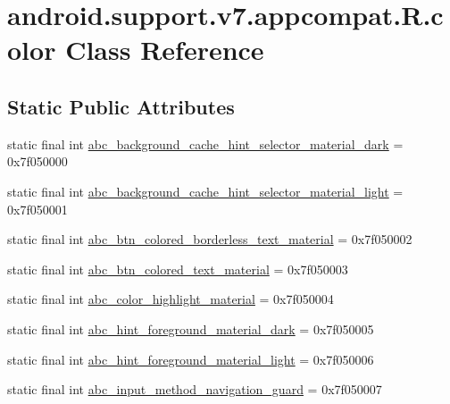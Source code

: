 \hypertarget{classandroid_1_1support_1_1v7_1_1appcompat_1_1_r_1_1color}{}\section{android.\+support.\+v7.\+appcompat.\+R.\+color Class Reference}
\label{classandroid_1_1support_1_1v7_1_1appcompat_1_1_r_1_1color}
\subsection*{Static Public Attributes}
\begin{DoxyCompactItemize}
\item 
static final int \mbox{\hyperlink{classandroid_1_1support_1_1v7_1_1appcompat_1_1_r_1_1color_a45abf46d211e98947a1719ec5c2e62e9}{abc\+\_\+background\+\_\+cache\+\_\+hint\+\_\+selector\+\_\+material\+\_\+dark}} = 0x7f050000
\item 
static final int \mbox{\hyperlink{classandroid_1_1support_1_1v7_1_1appcompat_1_1_r_1_1color_a7e19f3cbb99fc8d4205b7fafdb513fc8}{abc\+\_\+background\+\_\+cache\+\_\+hint\+\_\+selector\+\_\+material\+\_\+light}} = 0x7f050001
\item 
static final int \mbox{\hyperlink{classandroid_1_1support_1_1v7_1_1appcompat_1_1_r_1_1color_acefd1cd8f6a21577e1ee83c0f500b032}{abc\+\_\+btn\+\_\+colored\+\_\+borderless\+\_\+text\+\_\+material}} = 0x7f050002
\item 
static final int \mbox{\hyperlink{classandroid_1_1support_1_1v7_1_1appcompat_1_1_r_1_1color_af77cfaceff758c1bd874374593a64be6}{abc\+\_\+btn\+\_\+colored\+\_\+text\+\_\+material}} = 0x7f050003
\item 
static final int \mbox{\hyperlink{classandroid_1_1support_1_1v7_1_1appcompat_1_1_r_1_1color_ac136ab6cd85c7e58fd679a2653eaa58a}{abc\+\_\+color\+\_\+highlight\+\_\+material}} = 0x7f050004
\item 
static final int \mbox{\hyperlink{classandroid_1_1support_1_1v7_1_1appcompat_1_1_r_1_1color_ab3fa0960569289bcb05cdc34ced2bdf3}{abc\+\_\+hint\+\_\+foreground\+\_\+material\+\_\+dark}} = 0x7f050005
\item 
static final int \mbox{\hyperlink{classandroid_1_1support_1_1v7_1_1appcompat_1_1_r_1_1color_aa81ae0641c6229a90e8b381f2672d731}{abc\+\_\+hint\+\_\+foreground\+\_\+material\+\_\+light}} = 0x7f050006
\item 
static final int \mbox{\hyperlink{classandroid_1_1support_1_1v7_1_1appcompat_1_1_r_1_1color_a2b65b695a4c6070b98956b74e00d5f37}{abc\+\_\+input\+\_\+method\+\_\+navigation\+\_\+guard}} = 0x7f050007

\end{DoxyCompactItemize}
